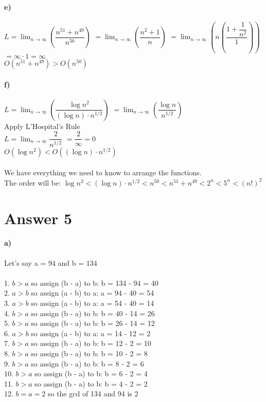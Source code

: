 \documentclass[12pt]{article}
\begin{document}
\paragraph{e)}
$L = \lim_{n \rightarrow \infty} (\dfrac{n^{51} + n^{49}}{n^{50}})$
$=  \lim_{n \rightarrow \infty} (\dfrac{n^{2} + 1}{n})$
$= \lim_{n \rightarrow \infty} (n(\dfrac{1 + \dfrac{1}{n^2}}{1}))$
$= \infty \cdot 1 = \infty$\\
$O(n^{51} + n^{49}) > O(n^{50})$


\paragraph{f)}
$L = \lim_{n \rightarrow \infty} (\dfrac{\log{n}^2}{(\log{n})\cdot n^{1/2}})$
$= \lim_{n \rightarrow \infty}  (\dfrac{\log{n}}{n^{1/2}})$\\
Apply L'Hospital's Rule\\
$L = \lim_{n \rightarrow \infty} \dfrac{2}{n^{1/2}}$
$= \dfrac{2}{\infty} = 0$\\
$O(\log{n}^2) < O((\log{n})\cdot n^{1/2})$\\
\\
We have everything we need to know to arrange the functions.\\
The order will be: $\log{n}^2 < (\log{n})\cdot n^{1/2} < n^{50} < n^{51} + n^{49} < 2^n < 5^n < (n!)^2$


\section*{Answer 5}
\paragraph{a)}
Let's say a = 94 and b = 134\\
\\
1. $b > a$ so assign (b - a) to b: b = 134 - 94 = 40\\
2. $a > b$ so assign (a - b) to a: a = 94 - 40 = 54\\
3. $a > b$ so assign (a - b) to a: a = 54 - 40 = 14\\
4. $b > a$ so assign (b - a) to b: b = 40 - 14 = 26\\
5. $b > a$ so assign (b - a) to b: b = 26 - 14 = 12\\
6. $a > b$ so assign (a - b) to a: a = 14 - 12 = 2\\
7. $b > a$ so assign (b - a) to b: b = 12 - 2 = 10\\
8. $b > a$ so assign (b - a) to b: b = 10 - 2 = 8\\
9. $b > a$ so assign (b - a) to b: b = 8 - 2 = 6\\
10. $b > a$ so assign (b - a) to b: b = 6 - 2 = 4\\
11. $b > a$ so assign (b - a) to b: b = 4 - 2 = 2\\
12. $b = a = 2$ so the gcd of 134 and 94 is 2
\end{document}
